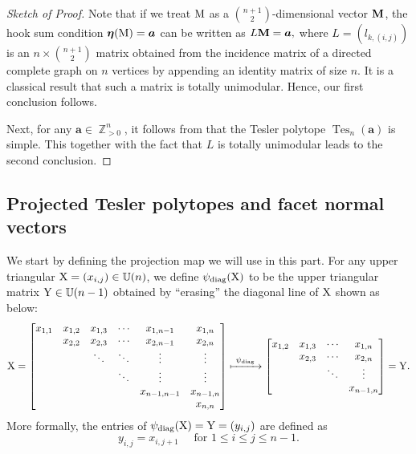\documentclass[12pt]{amsart}
\numberwithin{equation}{section}
\theoremstyle{definition}
\def\tes{\operatorname{Tes}}
\def\diag{\operatorname{diag}}
\def\ba{{\boldsymbol{a}}}
\def\Hs{\boldsymbol{\eta}}
\def\MM{{\rm{M}}}
\def\XX{{\rm{X}}}
\def\YY{{\rm{Y}}}
\def\Z{\operatorname{\mathbb{Z}}}
\begin{document}
\begin{proof}[Sketch of Proof]
Note that if we treat $\MM$ as a $\binom{n+1}{2}$-dimensional vector ${\bf M}$, the hook sum condition $\Hs(\MM) =\ba$ can be written as $L {\bf M} = \ba,$ where $L=(l_{k,(i,j)})$ is an $n \times \binom{n+1}{2}$ matrix obtained from the incidence matrix of a directed complete graph on $n$ vertices by appending an identity matrix of size $n$. It is a classical result \cite[Chapter 19]{Schrijver86} that such a matrix is totally unimodular. Hence, our first conclusion follows.

Next, for any $\ba \in \Z_{>0}^{n}$, it follows from \cite[Theorem 1.7]{Meszaros2017} that the Tesler polytope $\tes_{n}(\ba)$ is simple. This together with the fact that $L$ is totally unimodular leads to the second conclusion.
\end{proof}







\subsection{Projected Tesler polytopes and facet normal vectors} \label{subsec:ptes}

We start by defining the projection map we will use in this part. 
For any upper triangular $\XX =(x_{i,j}) \in \mathbb{U}(n)$, we define $\psi_{\diag}(\XX)$ to be the upper triangular matrix $\YY \in \mathbb{U}(n-1)$ obtained by ``erasing'' the diagonal line of $\XX$ shown as below:
	\[\XX = \begin{bmatrix}
	    x_{1,1} & x_{1,2} & x_{1,3} & \cdots & x_{1,n-1} & x_{1,n} \\
	    &  x_{2,2} & x_{2,3} & \cdots &x_{2,n-1} & x_{2,n}\\
        &   &\ddots& \ddots & \vdots & \vdots \\
	&   &  & \ddots & \vdots & \vdots \\
	&   &  & & x_{n-1,n-1}& x_{n-1,n}\\
	&    &    &  &      & x_{n,n}
      \end{bmatrix}\xmapsto{\ \psi_{\diag} \ } 
\begin{bmatrix}
x_{1,2} & x_{1,3} & \cdots & x_{1,n} \\
      & x_{2,3} & \cdots & x_{2,n}\\
      &       & \ddots& \vdots \\
      &       &       &x_{n-1,n}\\
\end{bmatrix}=\YY.\]
More formally, the entries of $\psi_{\diag}(\XX) = \YY=(y_{i,j})$ are defined as
	\begin{equation}
	  y_{i,j} = x_{i,j+1} \quad \text{ for } 1 \le i \le j \le n-1. 
\label{eq:psidiag}
	\end{equation}
\end{document}
